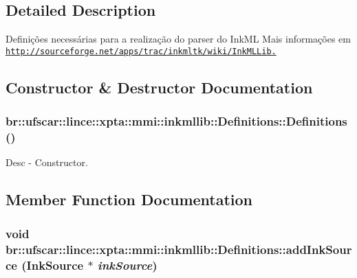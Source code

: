 \subsection{Detailed Description}
Definições necessárias para a realização do parser do InkML Mais informações em \href{http://sourceforge.net/apps/trac/inkmltk/wiki/InkMLLib.}{\tt http://sourceforge.net/apps/trac/inkmltk/wiki/InkMLLib.} 

\subsection{Constructor \& Destructor Documentation}
\hypertarget{classbr_1_1ufscar_1_1lince_1_1xpta_1_1mmi_1_1inkmllib_1_1Definitions_ad775a5baa40c2c83fe2f88ff61ada0ff}{
\subsubsection[{Definitions}]{\setlength{\rightskip}{0pt plus 5cm}br::ufscar::lince::xpta::mmi::inkmllib::Definitions::Definitions ()}}
\label{classbr_1_1ufscar_1_1lince_1_1xpta_1_1mmi_1_1inkmllib_1_1Definitions_ad775a5baa40c2c83fe2f88ff61ada0ff}


Desc -\/ Constructor. 



\subsection{Member Function Documentation}
\hypertarget{classbr_1_1ufscar_1_1lince_1_1xpta_1_1mmi_1_1inkmllib_1_1Definitions_a9121bec3de8b82278e614a2c021c5462}{
\subsubsection[{addInkSource}]{\setlength{\rightskip}{0pt plus 5cm}void br::ufscar::lince::xpta::mmi::inkmllib::Definitions::addInkSource (InkSource $\ast$ {\em inkSource})}}
\label{classbr_1_1ufscar_1_1lince_1_1xpta_1_1mmi_1_1inkmllib_1_1Definitions_a9121bec3de8b82278e614a2c021c5462}


